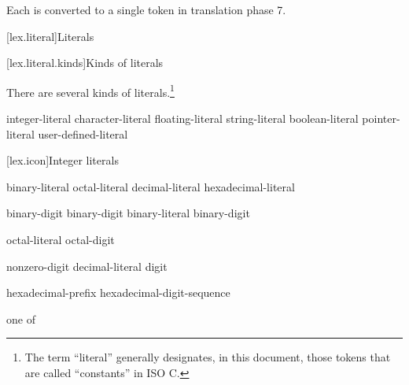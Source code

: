 Each  is converted to a single token
in translation phase 7.%
%

[lex.literal]{Literals}%

[lex.literal.kinds]{Kinds of literals}

\pnum
{}%
%
There are several kinds of literals.\footnote{The term ``literal'' generally designates, in this
document, those tokens that are called ``constants'' in
ISO C. }

\begin{bnf}
\br
    integer-literal\br
    character-literal\br
    floating-literal\br
    string-literal\br
    boolean-literal\br
    pointer-literal\br
    user-defined-literal
\end{bnf}

[lex.icon]{Integer literals}

%
\begin{bnf}
\br
    binary-literal \br
    octal-literal \br
    decimal-literal \br
    hexadecimal-literal 
\end{bnf}

\begin{bnf}
\br
     binary-digit\br
     binary-digit\br
    binary-literal  binary-digit
\end{bnf}

\begin{bnf}
\br
    \br
    octal-literal  octal-digit
\end{bnf}

\begin{bnf}
\br
    nonzero-digit\br
    decimal-literal  digit
\end{bnf}

\begin{bnf}
\br
    hexadecimal-prefix hexadecimal-digit-sequence
\end{bnf}

\begin{bnf}
 \textnormal{one of}\br
\end{bnf}

